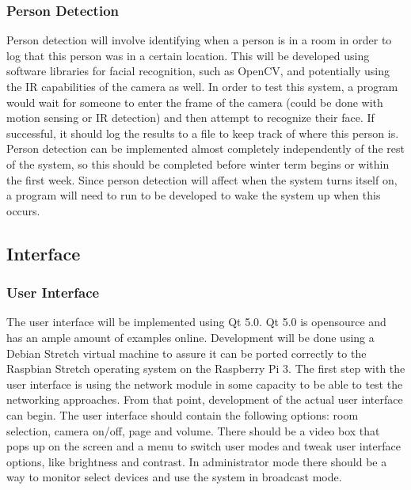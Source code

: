 \documentclass[onecolumn, draftclsnofoot,10pt, compsoc]{IEEEtran}
\begin{document}
\subsubsection{Person Detection}
Person detection will involve identifying when a person is in a room in order to log that this person was in a certain location. This will be developed using software libraries for facial recognition, such as OpenCV, and potentially using the IR capabilities of the camera as well. In order to test this system, a program would wait for someone to enter the frame of the camera (could be done with motion sensing or IR detection) and then attempt to recognize their face. If successful, it should log the results to a file to keep track of where this person is. Person detection can be implemented almost completely independently of the rest of the system, so this should be completed before winter term begins or within the first week. Since person detection will affect when the system turns itself on, a program will need to run to be developed to wake the system up when this occurs. 

\subsection{Interface}
\subsubsection{User Interface}
The user interface will be implemented using Qt 5.0. Qt 5.0 is opensource and has an ample amount of examples online. Development will be done using a Debian Stretch virtual machine to assure it can be ported correctly to the Raspbian Stretch operating system on the Raspberry Pi 3. The first step with the user interface is using the network module in some capacity to be able to test the networking approaches. From that point, development of the actual user interface can begin. The user interface should contain the following options: room selection, camera on/off, page and volume. There should be a video box that pops up on the screen and a menu to switch user modes and tweak user interface options, like brightness and contrast. In administrator mode there should be a way to monitor select devices and use the system in broadcast mode. 
\end{document}
